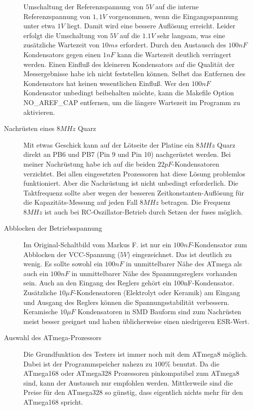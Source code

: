 \begin{description}
Umschaltung der Referenzspannung von \(5V\) auf die interne Referenzspannung von \(1,1V\) vorgenommen,
wenn die Eingangsspannung unter etwa \(1V\) liegt. Damit wird eine bessere Auflösung erreicht.
Leider erfolgt die Umschaltung von \(5V\) auf die \(1.1V\) sehr langsam, was eine zusätzliche
Wartezeit von \(10ms\) erfordert. Durch den Austausch des \(100nF\) Kondensators gegen einen \(1nF\)
kann die Wartezeit deutlich verringert werden. Einen Einfluß des kleineren Kondensators
auf die Qualität der Messergebnisse habe ich nicht feststellen können. Selbst das Entfernen
des Kondensators hat keinen wesentlichen Einfluß. Wer den \(100nF\) Kondensator unbedingt
beibehalten möchte, kann die Makefile Option NO\_AREF\_CAP entfernen, um die längere
Wartezeit im Programm zu aktivieren.
\item[Nachrüsten eines \(8MHz\) Quarz]
Mit etwas Geschick kann auf der Lötseite der Platine ein \(8MHz\) Quarz direkt an PB6 und PB7
(Pin 9 und Pin 10) nachgerüstet werden.
Bei meiner Nachrüstung habe ich auf die beiden \(22pF\)-Kondensatoren verzichtet.
Bei allen eingesetzten Prozessoren hat diese Lösung problemlos funktioniert.
Aber die Nachrüstung ist nicht unbedingt erforderlich. Die Taktfrequenz sollte aber
wegen der besseren Zeitkonstanten-Auflösung  für die Kapazitäts-Messung auf jeden Fall \(8MHz\) betragen.
Die Frequenz \(8MHz\) ist auch bei RC-Oszillator-Betrieb durch Setzen der fuses möglich.
\item[Abblocken der Betriebsspannung]
Im Original-Schaltbild vom Markus F. ist nur ein \(100nF\)-Kondensator zum Abblocken der
VCC-Spannung (\(5V\)) eingezeichnet. Das ist deutlich zu wenig. Es sollte sowohl ein
\(100nF\) in unmittelbarer Nähe des ATmega als auch ein \(100nF\) in unmittelbarer Nähe
des Spannungsreglers vorhanden sein. Auch an den Eingang des Reglers gehört ein
100nF-Kondensator. Zusätzliche \(10\mu F\)-Kondensatoren (Elektrolyt oder Keramik) am Eingang und
Ausgang des Reglers können die Spannungsstabilität verbessern. Keramische \(10\mu F\)
Kondensatoren in SMD Bauform sind zum Nachrüsten meist besser geeignet und
haben üblicherweise einen niedrigeren ESR-Wert.
\item[Auswahl des ATmega-Prozessors]
Die Grundfunktion des Testers ist immer noch mit dem ATmega8 möglich.
Dabei ist der Programmspeicher nahezu zu \(100\%\) benutzt.
Da die ATmega168 oder ATmega328 Prozessoren pinkompatibel zum ATmega8 sind,
kann der Austausch nur empfohlen werden. Mittlerweile sind die Preise für
den ATmega328 so günstig, dass eigentlich nichts mehr für den ATmega168 spricht.

\end{description}
